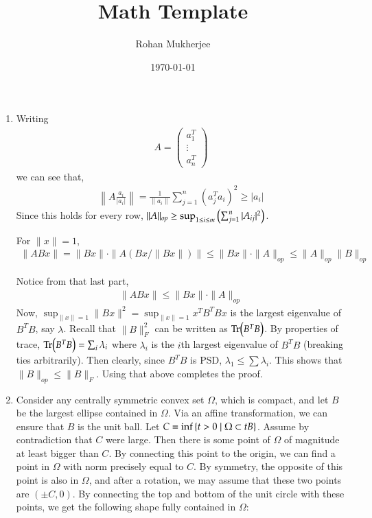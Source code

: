 \documentclass[12pt]{article}
\title{Math Template}
\date{\today}
\author{Rohan Mukherjee}
\theoremstyle{definitionstyle}
\newcommand{\mg}[1]{\| #1 \|}
\newcommand{\SET}[1]{\Set{\mskip-\medmuskip #1 \mskip-\medmuskip}}
\newcommand{\1}{\mathds 1}
\begin{document}
    \maketitle
    \begin{enumerate}
        \item Writing 
        \begin{align*}
            A = \begin{pmatrix}
                a_1^T \\
                \vdots \\
                a_n^T
            \end{pmatrix}
        \end{align*}
        we can see that,
        \begin{align*}
            \left\|A\frac{a_i}{|a_i|}\right\| = \frac{1}{\mg{a_i}}\sum_{j=1}^n (a_j^Ta_i)^2 \geq |a_i|
        \end{align*}
        Since this holds for every row, $\mg{A}_{op} \geq \sup_{1 \leq i \leq m} \qty(\sum_{j=1}^n |A_{ij}|^2)$.

        For $\mg{x} = 1$,
        \begin{align*}
            \mg{ABx} = \mg{Bx} \cdot \mg{A(Bx/\mg{Bx})} \leq \mg{Bx} \cdot \mg{A}_{op} \leq \mg{A}_{op}\mg{B}_{op}
        \end{align*}

        Notice from that last part,
        \begin{align*}
            \mg{ABx} \leq \mg{Bx} \cdot \mg{A}_{op}
        \end{align*}
        Now, $\sup_{\mg{x} = 1} \mg{Bx}^2 = \sup_{\mg{x} = 1} x^T B^T B x$ is the largest eigenvalue of $B^TB$, say $\lambda$. Recall that $\mg{B}_F^2$ can be written as $\Tr(B^TB)$. By properties of trace, $\Tr(B^TB) = \sum_i \lambda_i$ where $\lambda_i$ is the $i$th largest eigenvalue of $B^TB$ (breaking ties arbitrarily). Then clearly, since $B^TB$ is PSD, $\lambda_1 \leq \sum \lambda_i$. This shows that $\mg{B}_{op} \leq \mg{B}_F$. Using that above completes the proof.

        \item Consider any centrally symmetric convex set $\Omega$, which is compact, and let $B$ be the largest ellipse contained in $\Omega$. Via an affine transformation, we can ensure that $B$ is the unit ball. Let $C = \inf \SET{t > 0 \mid \Omega \subset tB}$. Assume by contradiction that $C$ were large. Then there is some point of $\Omega$ of magnitude at least bigger than $C$. By connecting this point to the origin, we can find a point in $\Omega$ with norm precisely equal to $C$. By symmetry, the opposite of this point is also in $\Omega$, and after a rotation, we may assume that these two points are $(\pm C, 0)$. By connecting the top and bottom of the unit circle with these points, we get the following shape fully contained in $\Omega$:


\end{enumerate}
\end{document}
